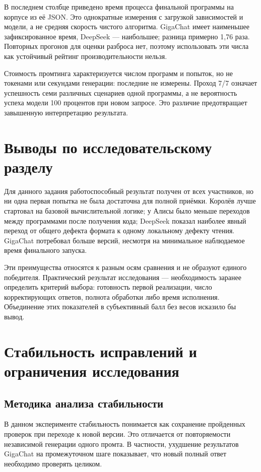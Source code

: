 В последнем столбце приведено время процесса финальной программы на корпусе из её JSON. Это однократные измерения с загрузкой зависимостей и модели, а не средняя скорость чистого алгоритма. GigaChat имеет наименьшее зафиксированное время, DeepSeek — наибольшее; разница примерно 1,76 раза. Повторных прогонов для оценки разброса нет, поэтому использовать эти числа как устойчивый рейтинг производительности нельзя.

Стоимость промтинга характеризуется числом программ и попыток, но не токенами или секундами генерации: последние не измерены. Проход 7/7 означает успешность семи различных сценариев одной программы, а не вероятность успеха модели 100 процентов при новом запросе. Это различие предотвращает завышенную интерпретацию результата.

\section{Выводы по исследовательскому разделу}
Для данного задания работоспособный результат получен от всех участников, но ни одна первая попытка не была достаточна для полной приёмки. Королёв лучше стартовал на базовой вычислительной логике; у Алисы было меньше переходов между программами после получения кода; DeepSeek показал наиболее явный переход от общего дефекта формата к одному локальному дефекту чтения. GigaChat потребовал больше версий, несмотря на минимальное наблюдаемое время финального запуска.

Эти преимущества относятся к разным осям сравнения и не образуют единого победителя. Практический результат исследования — необходимость заранее определить критерий выбора: готовность первой реализации, число корректирующих ответов, полнота обработки либо время исполнения. Объединение этих показателей в субъективный балл без весов исказило бы вывод.

\section{Стабильность исправлений и ограничения исследования}
\subsection{Методика анализа стабильности}
В данном эксперименте стабильность понимается как сохранение пройденных проверок при переходе к новой версии. Это отличается от повторяемости независимой генерации одного промта. В частности, ухудшение результатов GigaChat на промежуточном шаге показывает, что новый полный ответ необходимо проверять целиком.

